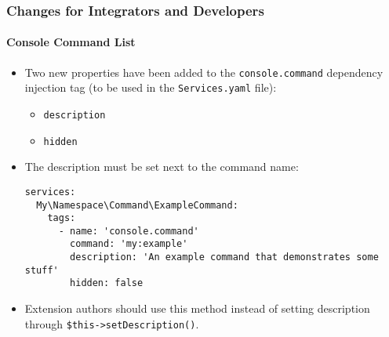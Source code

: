 %

\begin{frame}[fragile]
	\frametitle{Changes for Integrators and Developers}
	\framesubtitle{Console Command List}


	\begin{itemize}
		\item Two new properties have been added to the \texttt{console.command}
			dependency injection tag (to be used in the \texttt{Services.yaml} file):
			\begin{itemize}
				\item \texttt{description}
				\item \texttt{hidden}
			\end{itemize}
			\vspace{0.2cm}
		\item The description must be set next to the command name:
\begin{lstlisting}
services:
  My\Namespace\Command\ExampleCommand:
    tags:
      - name: 'console.command'
        command: 'my:example'
        description: 'An example command that demonstrates some stuff'
        hidden: false
\end{lstlisting}

		\item Extension authors should use this method instead of setting
			description through \texttt{\$this->setDescription()}.

	\end{itemize}

\end{frame}

